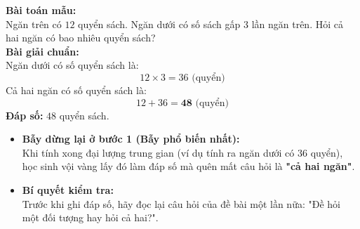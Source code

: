 \documentclass[11pt,a4paper]{article}
\begin{document}
\vspace{-2.5mm}
\noindent
\begin{minipage}[t]{0.49\textwidth}\vspace{0pt}
\begin{tcolorbox}[
  enhanced,
  colback=green!4!white,
  colframe=green!60!black,
  arc=2mm, boxrule=0.8pt,
  left=2mm, right=2mm, top=1.8mm, bottom=1.8mm,
  title={\footnotesize\bfseries\color{white}\faCheckCircle\ Ví dụ thực hành chuẩn mực}
]
{\footnotesize
\textbf{Bài toán mẫu:}\\
Ngăn trên có $12$ quyển sách. Ngăn dưới có số sách gấp $3$ lần ngăn trên. Hỏi cả hai ngăn có bao nhiêu quyển sách?\\
\textbf{Bài giải chuẩn:}\\
Ngăn dưới có số quyển sách là:
$$12 \times 3 = 36\text{ (quyển)}$$
Cả hai ngăn có số quyển sách là:
$$12 + 36 = \mathbf{48}\text{ (quyển)}$$
\phantom{Bài giải: }\textbf{Đáp số:} $48$ quyển sách.
}
\end{tcolorbox}
\end{minipage}
\hfill
\begin{minipage}[t]{0.49\textwidth}\vspace{0pt}
\begin{tcolorbox}[
  enhanced,
  colback=red!4!white,
  colframe=red!70!black,
  arc=2mm, boxrule=0.8pt,
  left=2mm, right=2mm, top=1.8mm, bottom=1.8mm,
  title={\footnotesize\bfseries\color{white}\faExclamationTriangle\ Mẹo tránh bẫy trắc nghiệm}
]
{\footnotesize
\begin{itemize}\setlength{\itemsep}{1.5pt}\setlength{\leftskip}{-2.5mm}
  \item \textbf{Bẫy dừng lại ở bước 1 (Bẫy phổ biến nhất):}\\
  Khi tính xong đại lượng trung gian (ví dụ tính ra ngăn dưới có $36$ quyển), học sinh vội vàng lấy đó làm đáp số mà quên mất câu hỏi là \textbf{"cả hai ngăn"}.
  \item \textbf{Bí quyết kiểm tra:}\\
  Trước khi ghi đáp số, hãy đọc lại câu hỏi của đề bài một lần nữa: "Đề hỏi một đối tượng hay hỏi cả hai?".
\end{itemize}
}
\end{tcolorbox}
\end{minipage}
\end{document}
